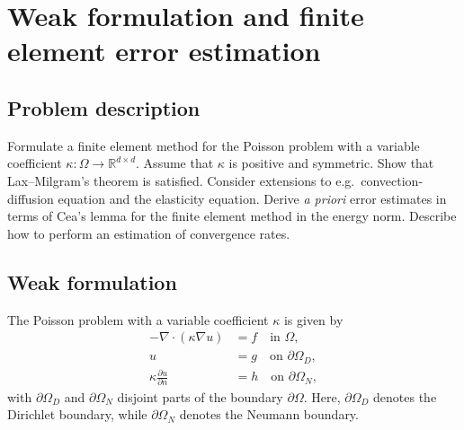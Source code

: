 \section{Weak formulation and finite element error estimation}
\subsection*{Problem description}
Formulate a finite element method for the Poisson problem with a variable coefficient $\kappa : \Omega \to \mathbb{R}^{d \times d}$.
Assume that $\kappa$ is positive and symmetric.
Show that Lax--Milgram's theorem is satisfied. %
Consider extensions to e.g.\ convection-diffusion equation and the elasticity equation.
Derive \textit{a priori} error estimates in terms of Cea's lemma for the finite element method in the energy norm.
Describe how to perform an estimation of convergence rates.

\subsection{Weak formulation}
The Poisson problem with a variable coefficient $\kappa$ is given by
\begin{equation}
    \begin{split}
        -\nabla \cdot (\kappa \nabla u) &= f \quad \text{in } \Omega, \\
        u &= g \quad \text{on } \partial\Omega_D, \\
        \kappa \frac{\partial u}{\partial n} &= h \quad \text{on } \partial\Omega_N,
    \end{split}
\end{equation}
with $\partial\Omega_D$ and $\partial\Omega_N$ disjoint parts of the boundary $\partial\Omega$.
Here, $\partial\Omega_D$ denotes the Dirichlet boundary, while $\partial\Omega_N$ denotes the Neumann boundary.

